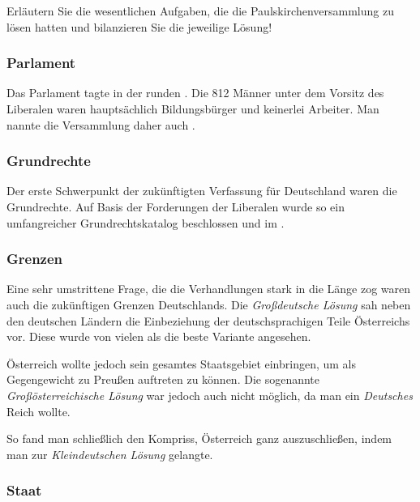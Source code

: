 \begin{aufgabe}
Erläutern Sie die wesentlichen Aufgaben, die die
Paulskirchenversammlung zu lösen hatten und bilanzieren Sie die
jeweilige Lösung! 
\end{aufgabe}

\subsubsection{Parlament}

Das Parlament tagte in der runden
.
Die 812 Männer unter dem Vorsitz des Liberalen  waren hauptsächlich Bildungsbürger und
keinerlei Arbeiter. Man nannte die Versammlung daher auch
.


\subsubsection{Grundrechte}

Der erste Schwerpunkt der zukünftigten Verfassung für Deutschland
waren die Grundrechte. Auf Basis der Forderungen der Liberalen wurde
so ein umfangreicher Grundrechtskatalog beschlossen und im
.


\subsubsection{Grenzen}

Eine sehr umstrittene Frage, die die Verhandlungen stark in die Länge
zog waren auch die zukünftigen Grenzen Deutschlands. Die
\emph{Großdeutsche Lösung}  sah neben den
deutschen Ländern die Einbeziehung der deutschsprachigen Teile
Österreichs vor. Diese wurde von vielen als die beste Variante
angesehen.

Österreich wollte jedoch sein gesamtes Staatsgebiet
einbringen, um als Gegengewicht zu Preußen auftreten zu können. Die
sogenannte \emph{Großösterreichische Lösung}
 war jedoch auch nicht möglich, da
man ein \emph{Deutsches} Reich wollte.

So fand man schließlich den Kompriss, Österreich ganz auszuschließen,
indem man zur \emph{Kleindeutschen Lösung}  gelangte.


\subsubsection{Staat}

